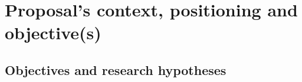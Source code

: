 

\section{Proposal's context, positioning and objective(s)}




\subsection{Objectives and research hypotheses}
 

